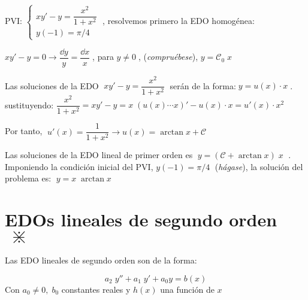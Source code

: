 \begin{cuadro-gris}
\begin{ejem}

PVI: $\begin{cases} xy'-y=\dfrac {x^2}{1+x^2} \\ y(-1)=\pi/4 \end{cases}\; $, resolvemos primero la EDO homogénea:

$xy'-y=0 \to \dfrac{\dd y}{y}= \dfrac {\dd x }{x}\; $, para $y\neq 0\; $, (\emph{compruébese}), $y=\mathcal{C}_0\; x$ 

Las soluciones de la EDO $\; xy'-y=\dfrac {x^2}{1+x^2} \; $ serán de la forma:$\; y= u(x) \cdot  x \; $. sustituyendo:
$\dfrac {x^2}{1+x^2}= xy'-y=x\; \left( u(x) \cdots x \right)' - u(x) \cdot x =u'(x) \cdot x^2$

Por tanto, $\; u'(x)=\dfrac {1}{1+x^2}  \to u(x)=\arctan x + \mathcal C$

Las soluciones de la EDO lineal de primer orden es $\; y=\left( \mathcal C + \arctan x \right)\; x\; $ . Imponiendo la condición inicial del PVI, $y(-1)=\pi/4\; $ (\emph{hágase}), la solución del problema es: $\;y=x\; \arctan x \; $

\end{ejem}
\end{cuadro-gris}


\section{EDOs lineales de segundo orden $\;\divideontimes$}

\begin{cuadro-naranja}
\begin{defi}
Las EDO lineales de segundo orden son de la forma:

\begin{equation*}
  \boxed{ \; a_2\; y'' + a_1	\; y' + a_0 y= b(x) \; }
\end{equation*}
	Con $a_0\neq 0, \; b_0$ constantes reales y $h(x)$ una función de $x$
\end{defi}
\end{cuadro-naranja}

